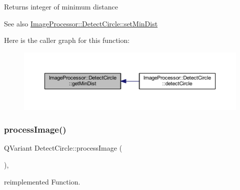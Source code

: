 \begin{DoxyReturn}{Returns}
integer of minimum distance 
\end{DoxyReturn}
\begin{DoxySeeAlso}{See also}
\hyperlink{class_image_processor_1_1_detect_circle_a09bb7bbe753372179b49f94370800021}{Image\+Processor\+::\+Detect\+Circle\+::set\+Min\+Dist} 
\end{DoxySeeAlso}
Here is the caller graph for this function\+:\nopagebreak
\begin{figure}[H]
\begin{center}
\leavevmode
\includegraphics[width=350pt]{d6/d8e/class_image_processor_1_1_detect_circle_a9e83f089602650f7afcb97172a23f329_icgraph}
\end{center}
\end{figure}
\mbox{\label{class_image_processor_1_1_detect_circle_ae0c7b4759827b218a03b16567233b4d5}} 
\subsubsection{\texorpdfstring{process\+Image()}{processImage()}\hspace{0.1cm}{\footnotesize\ttfamily [1/2]}}
{\footnotesize\ttfamily Q\+Variant Detect\+Circle\+::process\+Image (\begin{DoxyParamCaption}{ }\end{DoxyParamCaption})\hspace{0.3cm}{\ttfamily [override]}, {\ttfamily [virtual]}}



reimplemented Function. 

